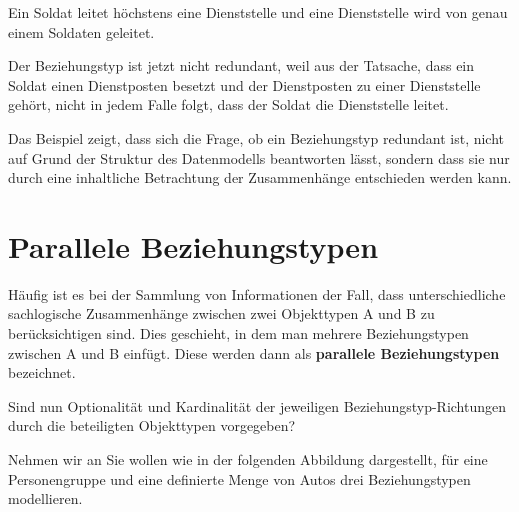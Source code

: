           Ein Soldat leitet h\"ochstens eine Dienststelle und eine Dienststelle wird von genau einem Soldaten geleitet.
          \begin{center}
          \end{center}
          Der Beziehungstyp ist jetzt nicht redundant, weil aus der Tatsache, dass ein Soldat einen Dienstposten besetzt und der Dienstposten zu einer Dienststelle geh\"ort, nicht in jedem Falle folgt, dass der Soldat die Dienststelle leitet.

          Das Beispiel zeigt, dass sich die Frage, ob ein Beziehungstyp redundant ist, nicht auf Grund der Struktur des Datenmodells beantworten l\"asst, sondern dass sie nur durch eine inhaltliche Betrachtung der Zusammenh\"ange entschieden werden kann.
      \section{Parallele Beziehungstypen}
        H\"aufig ist es bei der Sammlung von Informationen der Fall, dass unterschiedliche sachlogische Zusammenh\"ange zwischen zwei Objekttypen A und B zu ber\"ucksichtigen sind. Dies geschieht, in dem man mehrere Beziehungstypen zwischen A und B einf\"ugt. Diese werden dann als \textbf{parallele Beziehungstypen} bezeichnet.

        Sind nun Optionalit\"at und Kardinalit\"at der jeweiligen Beziehungstyp-Richtungen durch die beteiligten Objekttypen vorgegeben?

        Nehmen wir an Sie wollen wie in der folgenden Abbildung dargestellt, f\"ur eine Personengruppe und eine definierte Menge von Autos drei Beziehungstypen modellieren.

